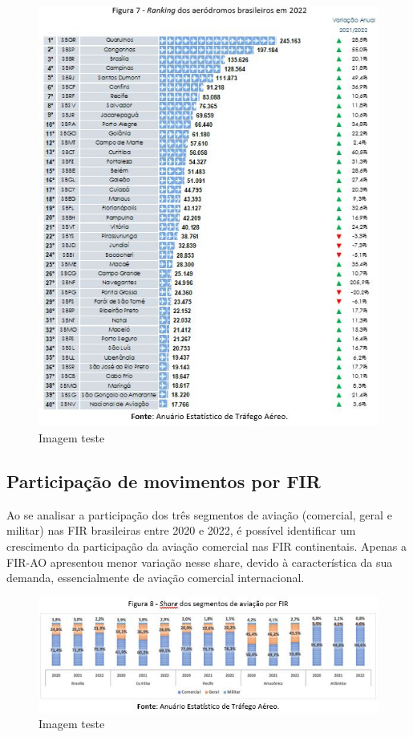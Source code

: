 \documentclass[
]{book}
\begin{document}
\begin{figure}
\centering
\includegraphics{imagens/fig13.jpg}
\caption{Imagem teste}
\end{figure}

\hypertarget{participauxe7uxe3o-de-movimentos-por-fir}{%
\subsection{Participação de movimentos por FIR}\label{participauxe7uxe3o-de-movimentos-por-fir}}

Ao se analisar a participação dos três segmentos de aviação (comercial, geral e militar) nas FIR brasileiras entre 2020 e 2022, é possível identificar um crescimento da participação da aviação comercial nas FIR continentais. Apenas a FIR-AO apresentou menor variação nesse share, devido à característica da sua demanda, essencialmente de aviação comercial internacional.

\begin{figure}
\centering
\includegraphics{imagens/fig14.jpg}
\caption{Imagem teste}
\end{figure}
\end{document}
